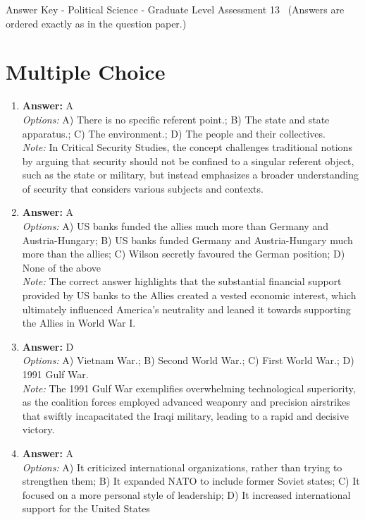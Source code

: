 \documentclass[12pt]{article}
\begin{document}
\begin{center}
Answer Key - Political Science - Graduate Level Assessment 13 \
\small (Answers are ordered exactly as in the question paper.)
\end{center}

\section*{Multiple Choice}
\begin{enumerate}[label=\arabic*.]
\item \textbf{Answer:} A
\\ \textit{Options:} A) There is no specific referent point.; B) The state and state apparatus.; C) The environment.; D) The people and their collectives.
\\ \textit{Note:} In Critical Security Studies, the concept challenges traditional notions by arguing that security should not be confined to a singular referent object, such as the state or military, but instead emphasizes a broader understanding of security that considers various subjects and contexts.
\item \textbf{Answer:} A
\\ \textit{Options:} A) US banks funded the allies much more than Germany and Austria-Hungary; B) US banks funded Germany and Austria-Hungary much more than the allies; C) Wilson secretly favoured the German position; D) None of the above
\\ \textit{Note:} The correct answer highlights that the substantial financial support provided by US banks to the Allies created a vested economic interest, which ultimately influenced America's neutrality and leaned it towards supporting the Allies in World War I.
\item \textbf{Answer:} D
\\ \textit{Options:} A) Vietnam War.; B) Second World War.; C) First World War.; D) 1991 Gulf War.
\\ \textit{Note:} The 1991 Gulf War exemplifies overwhelming technological superiority, as the coalition forces employed advanced weaponry and precision airstrikes that swiftly incapacitated the Iraqi military, leading to a rapid and decisive victory.
\item \textbf{Answer:} A
\\ \textit{Options:} A) It criticized international organizations, rather than trying to strengthen them; B) It expanded NATO to include former Soviet states; C) It focused on a more personal style of leadership; D) It increased international support for the United States

\end{enumerate}
\end{document}
